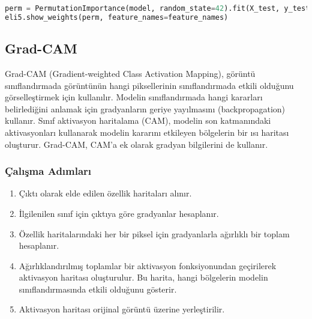 \begin{lstlisting}[language=Python]
perm = PermutationImportance(model, random_state=42).fit(X_test, y_test)
eli5.show_weights(perm, feature_names=feature_names)
\end{lstlisting}

\newpage

\subsection{Grad-CAM}
Grad-CAM (Gradient-weighted Class Activation Mapping), görüntü sınıflandırmada görüntünün hangi piksellerinin sınıflandırmada etkili olduğunu görselleştirmek için kullanılır. Modelin sınıflandırmada hangi kararları belirlediğini anlamak için gradyanların geriye yayılmasını (backpropagation) kullanır. Sınıf aktivasyon haritalama (CAM), modelin son katmanındaki aktivasyonları kullanarak modelin kararını etkileyen bölgelerin bir ısı haritası oluşturur. Grad-CAM, CAM'a ek olarak gradyan bilgilerini de kullanır.

\subsubsection{Çalışma Adımları}
\begin{enumerate}
    \item Çıktı olarak elde edilen özellik haritaları alınır.
    \item İlgilenilen sınıf için çıktıya göre gradyanlar hesaplanır.
    \item Özellik haritalarındaki her bir piksel için gradyanlarla ağırlıklı bir toplam hesaplanır. 
    \item Ağırlıklandırılmış toplamlar bir aktivasyon fonksiyonundan geçirilerek aktivasyon haritası oluşturulur. Bu harita, hangi bölgelerin modelin sınıflandırmasında etkili olduğunu gösterir.
    \item Aktivasyon haritası orijinal görüntü üzerine yerleştirilir.
\end{enumerate}

\newpage